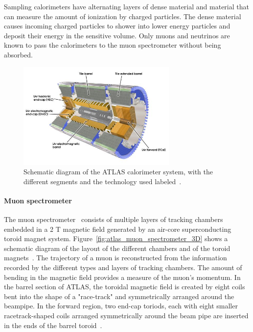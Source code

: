 Sampling calorimeters have alternating layers of dense material and material that can measure the amount of ionization by charged particles. The dense material causes incoming charged particles to shower into lower energy particles and deposit their energy in the sensitive volume. Only muons and neutrinos are known to pass the calorimeters to the muon spectrometer without being absorbed. 

\begin{figure}[h]
    \centering
    \includegraphics[width = 0.7\textwidth]{figures/atlas_calorimeter.png}
    \caption{Schematic diagram of the ATLAS calorimeter system, with the different segments and the technology used labeled~\cite{collaboration_atlas_2008}.}
    \label{fig:atlas_calorimeter}
\end{figure}

\paragraph*{Muon spectrometer} \hfill \break
The muon spectrometer~\cite{atlas_muon_spectrometer_tdr} consists of multiple layers of tracking chambers embedded in a 2 T magnetic field generated by an air-core superconducting toroid magnet system. Figure~\ref{fig:atlas_muon_spectrometer_3D} shows a schematic diagram of the layout of the different chambers and of the toroid magnets~\cite{collaboration_atlas_2008}. The trajectory of a muon is reconstructed from the information recorded by the different types and layers of tracking chambers. The amount of bending in the magnetic field provides a measure of the muon's momentum. In the barrel section of ATLAS, the toroidal magnetic field is created by eight coils bent into the shape of a  "race-track"  and symmetrically arranged around the beampipe.  In the forward region, two end-cap toriods, each with eight smaller racetrack-shaped coils arranged symmetrically around the beam pipe are inserted in the ends of the barrel toroid~\cite{atlas_magnet_tdr}.

